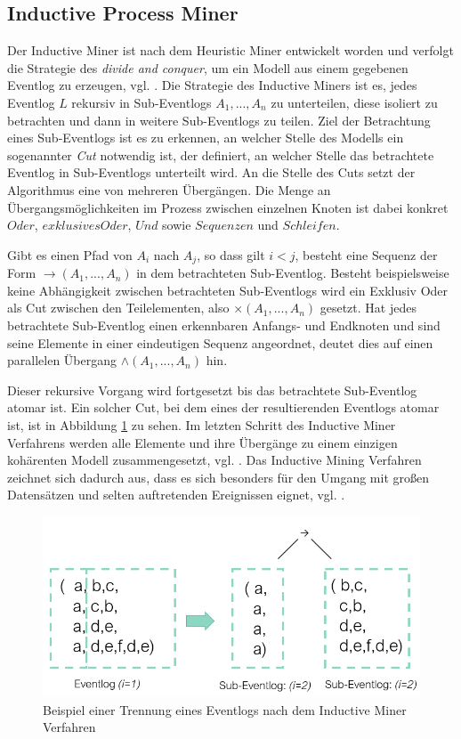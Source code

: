 \subsection{Inductive Process Miner}\label{sec:inducMiner}
Der Inductive Miner ist nach dem Heuristic Miner entwickelt worden und verfolgt die Strategie des \textit{divide and conquer}, um ein Modell aus einem gegebenen Eventlog zu erzeugen, vgl. \cite{inducMining}. 
Die Strategie des Inductive Miners ist es, jedes Eventlog $L$ rekursiv in Sub-Eventlogs $A_1 , ... , A_n$ zu unterteilen, diese isoliert zu betrachten und dann in weitere Sub-Eventlogs zu teilen. 
Ziel der Betrachtung eines Sub-Eventlogs ist es zu erkennen, an welcher Stelle des Modells ein sogenannter \textit{Cut} notwendig ist, der definiert, an welcher Stelle das betrachtete Eventlog in Sub-Eventlogs unterteilt wird. An die Stelle des Cuts setzt der Algorithmus eine von mehreren Übergängen. Die Menge an Übergangsmöglichkeiten im Prozess zwischen einzelnen Knoten ist dabei konkret $Oder$, $exklusives  Oder$, $Und$ sowie $Sequenzen$ und $Schleifen$. 

\newpage
Gibt es einen Pfad von $A_i$ nach $A_j$, so dass gilt $ i < j $, besteht eine Sequenz der Form $ → (A_1 , ... , A_n)$ in dem betrachteten Sub-Eventlog.
Besteht beispielsweise keine Abhängigkeit zwischen betrachteten Sub-Eventlogs wird ein Exklusiv Oder als Cut zwischen den Teilelementen, also $ × (A_1 , ... , A_n)$ gesetzt. 
Hat jedes betrachtete Sub-Eventlog einen erkennbaren Anfangs- und Endknoten und sind seine Elemente in einer eindeutigen Sequenz angeordnet, deutet dies auf einen parallelen Übergang $ ∧ (A_1 , ... , A_n)$ hin. 

Dieser rekursive Vorgang wird fortgesetzt bis das betrachtete Sub-Eventlog atomar ist. Ein solcher Cut, bei dem eines der resultierenden Eventlogs atomar ist, ist in Abbildung \ref{fig:imExample} zu sehen. Im letzten Schritt des Inductive Miner Verfahrens werden alle Elemente und ihre Übergänge zu einem einzigen kohärenten Modell zusammengesetzt, vgl. \cite{inducMining}. Das Inductive Mining Verfahren zeichnet sich dadurch aus, dass es sich besonders für den Umgang mit großen Datensätzen und selten auftretenden Ereignissen eignet, vgl. \cite{minerEval}.

\begin{figure}[!h]
    \centering
    \includegraphics[scale=0.5]{figures/Appbildungen/im_example.PNG}
    \caption{Beispiel einer Trennung eines Eventlogs nach dem Inductive Miner Verfahren}
    \label{fig:imExample}
\end{figure}

